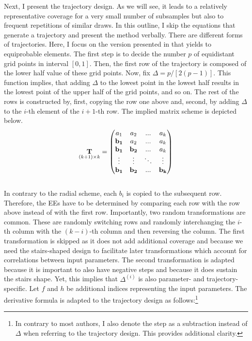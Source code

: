 \documentclass[a4paper,12pt]{article}
\begin{document}
\noindent
Next, I present the trajectory design. As we will see, it leads to a relatively representative coverage for a very small number of subsamples but also to frequent repetitions of similar draws.
In this outline, I skip the equations that generate a trajectory and present the method verbally.
There are different forms of trajectories. Here, I focus on the version presented in \cite{Morris.1991} that yields to equiprobable elements. The first step is to decide the number $p$ of equidistant grid points in interval $[0,1]$. Then, the first row of the trajectory is composed of the lower half value of these grid points. Now, fix $\Delta = p/[2(p-1)]$. This function implies, that adding $\Delta$ to the lowest point in the lowest half results in the lowest point of the upper half of the grid points, and so on. The rest of the rows is constructed by, first, copying the row one above and, second, by adding $\Delta$ to the $i$-th element of the $i+1$-th row. The implied matrix scheme is depicted below.
\begin{align}
\underset{(k+1)\times k}{\bold{T}} =
\begin{pmatrix}
a_1 & a_2 & ... & a_k \\
\bold{b_1} & a_2 & ... & a_k \\
\bold{b_1} & \bold{b_2} & ... & a_k \\
\vdots & \vdots & 	\ddots & \vdots\\
\bold{b_1} & \bold{b_2} & ... & \bold{b_k}
\end{pmatrix}
\end{align}
\\

\noindent
In contrary to the radial scheme, each $b_i$ is copied to the subsequent row. Therefore, the EEs have to be determined by comparing each row with the row above instead of with the first row.
Importantly, two random transformations are common. These are randomly switching rows and randomly interchanging the $i$-th column with the $(k-i)$-th column and then reversing the column. The first transformation is skipped as it does not add additional coverage and because we need the stairs-shaped design to facilitate later transformations which account for correlations between input parameters. The second transformation is adapted because it is important to also have negative steps and because it does sustain the stairs shape. Yet, this implies that $\Delta^{(i)}$ is also parameter- and trajectory-specific. Let $f$ and $h$ be additional indices representing the input parameters. The derivative formula is adapted to the trajectory design as follows:\footnote{In contrary to most authors, I also denote the step as a subtraction instead of $\Delta$ when referring to the trajectory design. This provides additional clarity.}
\end{document}

